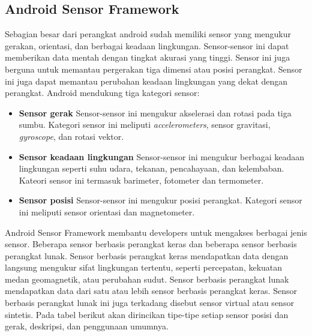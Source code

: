 \subsection{Android Sensor Framework}
\label{sec:android_sensor_framework}
\cite{android_developers}Sebagian besar dari perangkat android sudah memiliki sensor yang mengukur gerakan, orientasi, dan berbagai keadaan lingkungan. Sensor-sensor ini dapat memberikan data mentah dengan tingkat akurasi yang tinggi. Sensor ini juga berguna untuk memantau pergerakan tiga dimensi atau posisi perangkat. Sensor ini juga dapat memantau perubahan keadaan lingkungan yang dekat dengan perangkat. 
Android mendukung tiga kategori sensor:
\begin{itemize}
	\item \textbf{Sensor gerak}
	Sensor-sensor ini mengukur akselerasi dan rotasi pada tiga sumbu. Kategori sensor ini meliputi \textit{accelerometers}, sensor gravitasi, \textit{gyroscope}, dan rotasi vektor. 
	\item \textbf{Sensor keadaan lingkungan}
	Sensor-sensor ini mengukur berbagai keadaan lingkungan seperti suhu udara, tekanan, pencahayaan, dan kelembaban. Kateori sensor ini termasuk barimeter, fotometer dan termometer.
	\item \textbf{Sensor posisi}
	Sensor-sensor ini mengukur posisi perangkat. Kategori sensor ini meliputi sensor orientasi dan magnetometer.
\end{itemize}
Android Sensor Framework membantu developers untuk mengakses berbagai jenis sensor. Beberapa sensor berbasis perangkat keras dan beberapa sensor berbasis perangkat lunak. Sensor berbasis perangkat keras mendapatkan data dengan langsung mengukur sifat lingkungan tertentu, seperti percepatan, kekuatan medan geomagnetik, atau perubahan sudut. Sensor berbasis perangkat lunak mendapatkan data dari satu atau lebih sensor berbasis perangkat keras. Sensor berbasis perangkat lunak ini juga terkadang disebut sensor virtual atau sensor sintetis. Pada tabel berikut akan dirincikan tipe-tipe setiap sensor posisi dan gerak, deskripsi, dan penggunaan umumnya.

